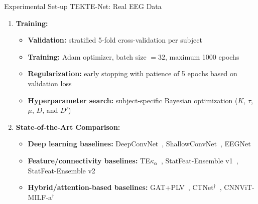 \documentclass[aspectratio=169]{beamer}
\let\oldcite\cite
\renewcommand{\cite}[1]{{\tiny\oldcite{#1}}}
\begin{document}
\begin{frame}{Experimental Set-up TEKTE-Net: Real EEG Data}

\setlength{\leftmargini}{1.4em}
\setlength{\leftmarginii}{1.2em}
\setlength{\fboxsep}{1.2pt}

\vspace{0.35cm}


\begin{enumerate}

\item \textbf{\normalsize Training:}

\vspace{0.04cm}

\begin{itemize}\itemsep2pt
    \item \textbf{Validation:} stratified 5-fold cross-validation per subject
    \item \textbf{Training:} Adam optimizer, batch size $=32$, maximum 1000 epochs
    \item \textbf{Regularization:} early stopping with patience of 5 epochs based on validation loss
    \item \textbf{Hyperparameter search:} subject-specific Bayesian optimization 
    ($K$, $\tau$, $\mu$, $D$, and $D'$)
\end{itemize}

\vspace{0.08cm}

\item \textbf{\normalsize State-of-the-Art Comparison:}

\vspace{0.04cm}

\begin{itemize}\itemsep2pt
    \item \textbf{Deep learning baselines:} 
    DeepConvNet~\cite{schirrmeister2017deep}, 
    ShallowConvNet~\cite{schirrmeister2017deep}, 
    EEGNet~\cite{lawhern2018eegnet}

    \item \textbf{Feature/connectivity baselines:} 
    TE$\kappa_{\alpha}$~\cite{de2019data}, 
    StatFeat-Ensemble v1~\cite{Degirmenci2023}, 
    StatFeat-Ensemble v2~\cite{Degirmenci2024}

    \item \textbf{Hybrid/attention-based baselines:} 
    GAT+PLV~\cite{patel2025advancing}, 
    CTNet$^{\dagger}$~\cite{CTNet}, 
    CNNViT-MILF-a$^{\dagger}$~\cite{CNNViT}
\end{itemize}

\end{enumerate}

\end{frame}
\end{document}
